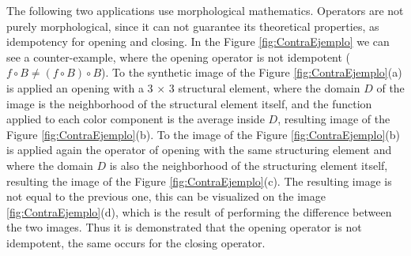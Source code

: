 The following two applications use morphological mathematics. Operators are not purely morphological, since it can not guarantee its theoretical properties, as idempotency for opening and closing. In the Figure \ref{fig:ContraEjemplo} we can see a counter-example, where the opening operator is not  idempotent ($f\circ B \neq (f\circ B) \circ B$). To the synthetic image of the Figure \ref{fig:ContraEjemplo}(a) is applied an opening with a 3 $\times$ 3 structural element, where the domain $D$ of the image is the neighborhood of the structural element itself, and the function applied to each color component is the average inside $D$, resulting image of the Figure \ref{fig:ContraEjemplo}(b). To the image of the Figure  \ref{fig:ContraEjemplo}(b) is applied again the operator of opening with the same structuring element and where the domain $D$ is also the neighborhood of the structuring element itself, resulting the image of the Figure \ref{fig:ContraEjemplo}(c). The resulting image is not equal to the previous one, this can be visualized on the image \ref{fig:ContraEjemplo}(d), which is the result of performing the difference between the two images. Thus it is demonstrated that the opening operator is not idempotent, the same occurs for the closing operator.


\begin{figure*}
	\\
	\caption{A counter-example shows that openness is not idempotent with the ordering proposed.}	
	\label{fig:ContraEjemplo}
\end{figure*}

